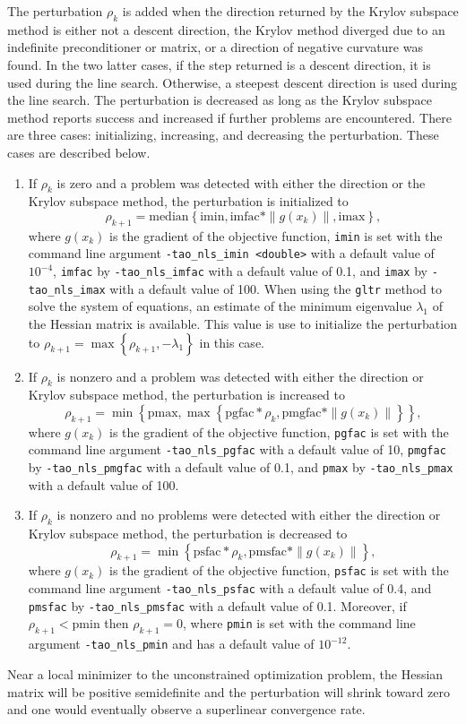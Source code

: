 The perturbation $\rho_k$ is added when the direction returned by the
Krylov subspace method is either not a descent direction, the Krylov method
diverged due to an indefinite preconditioner or matrix, or a direction of 
negative curvature was found.  In the two latter cases, if the step returned
is a descent direction, it is used during the line search.  Otherwise, a
steepest descent direction is used during the line search.  The perturbation
is decreased as long as the Krylov subspace method reports success and 
increased if further problems are encountered.  There are three cases:
initializing, increasing, and decreasing the perturbation.  These cases
are described below.
\begin{enumerate}
\item If $\rho_k$ is zero and a problem was detected with either the
direction or the Krylov subspace method, the perturbation is initialized to
\[
\rho_{k+1} = \mbox{median}\left\{\mbox{imin}, \mbox{imfac} * \|g(x_k)\|, \mbox{imax}\right\},
\]
where $g(x_k)$ is the gradient of the objective function, {\tt imin} is set 
with the command line argument {\tt -tao\_nls\_imin <double>} with a default 
value of $10^{-4}$, {\tt imfac} by {\tt -tao\_nls\_imfac} with a default 
value of 0.1, and {\tt imax} by {\tt -tao\_nls\_imax} with a default value 
of 100.  
When using the {\tt gltr} method to solve the system of equations, an
estimate of the minimum eigenvalue $\lambda_1$ of the Hessian matrix 
is available.  This value is use to initialize the perturbation to
$\rho_{k+1} = \max\left\{\rho_{k+1}, -\lambda_1\right\}$ in this
case.
\item If $\rho_k$ is nonzero and a problem was detected with either the 
direction or Krylov subspace method, the perturbation is increased to 
\[
\rho_{k+1} = \min\left\{\mbox{pmax}, \max\left\{\mbox{pgfac} * \rho_k, \mbox{pmgfac} * \|g(x_k)\|\right\}\right\},
\]
where $g(x_k)$ is the gradient of the objective function, {\tt pgfac} is set 
with the command line argument {\tt -tao\_nls\_pgfac}
with a default value of 10, {\tt pmgfac} by {\tt -tao\_nls\_pmgfac} with a
default value of 0.1, and {\tt pmax} by {\tt -tao\_nls\_pmax} with a default
value of 100.
\item If $\rho_k$ is nonzero and no problems were detected with either
the direction or Krylov subspace method, the perturbation is decreased to
\[
\rho_{k+1} = \min\left\{\mbox{psfac} * \rho_k, \mbox{pmsfac} * \|g(x_k)\|\right\},
\]
where $g(x_k)$ is the gradient of the objective function, {\tt psfac} is set 
with the command line argument {\tt -tao\_nls\_psfac}
with a default value of 0.4, and {\tt pmsfac} by {\tt -tao\_nls\_pmsfac} with
a default value of 0.1.  Moreover, if $\rho_{k+1} < \mbox{pmin}$ then 
$\rho_{k+1} = 0$, where {\tt pmin} is set with the command line argument 
{\tt -tao\_nls\_pmin} and has a default value of $10^{-12}$.
\end{enumerate}
Near a local minimizer to the unconstrained optimization problem, the
Hessian matrix will be positive semidefinite and the perturbation will 
shrink toward zero and one would eventually observe a superlinear
convergence rate.

